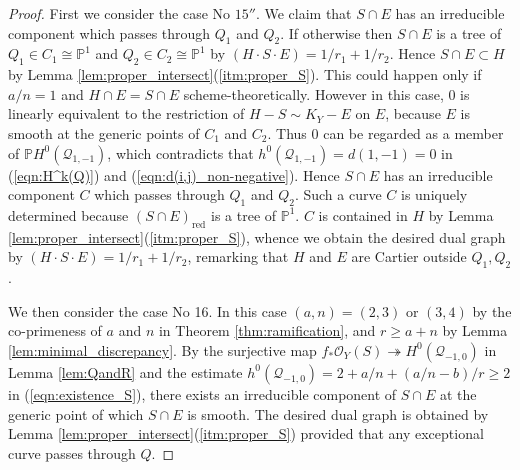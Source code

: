 \documentclass[a4paper,11pt]{amsart}
\theoremstyle{definition}
\theoremstyle{remark}
\numberwithin{equation}{section}
\newcommand{\bP}{{\mathbb P}}
\newcommand{\cO}{{\mathcal O}}
\newcommand{\cQ}{{\mathcal Q}}
\newcommand{\red}{\mathrm{red}}
\begin{document}
\begin{proof}
First we consider the case No $\textrm{15}''$.
We claim that $S \cap E$ has an irreducible component
which passes through $Q_1$ and $Q_2$.
If otherwise then  $S \cap E$ is a tree of
$Q_1 \in C_1 \cong \bP^1$ and $Q_2 \in C_2 \cong \bP^1$
by $(H \cdot S \cdot E)=1/r_1+1/r_2$.
Hence $S \cap E \subset H$
by Lemma \ref{lem:proper_intersect}(\ref{itm:proper_S}).
This could happen only if $a/n=1$ and
$H \cap E=S \cap E$ scheme-theoretically.
However in this case,
$0$ is linearly equivalent to the restriction of $H-S \sim K_Y-E$ on $E$,
because $E$ is smooth at the generic points of $C_1$ and $C_2$.
Thus $0$ can be regarded as a member of $\bP H^0(\cQ_{1,-1})$,
which contradicts that $h^0(\cQ_{1,-1})=d(1,-1)=0$
in (\ref{eqn:H^k(Q)}) and (\ref{eqn:d(i,j)_non-negative}).
Hence $S \cap E$ has an irreducible component $C$
which passes through $Q_1$ and $Q_2$.
Such a curve $C$ is uniquely determined
because $(S \cap E)_\red$ is a tree of $\bP^1$.
$C$ is contained in $H$
by Lemma \ref{lem:proper_intersect}(\ref{itm:proper_S}),
whence we obtain the desired dual graph by $(H \cdot S \cdot E)=1/r_1+1/r_2$,
remarking that $H$ and $E$ are Cartier outside $Q_1,Q_2$.

We then consider the case No 16.
In this case $(a,n)=(2,3)$ or $(3,4)$ by
the co-primeness of $a$ and $n$ in Theorem \ref{thm:ramification},
and $r \ge a+n$ by Lemma \ref{lem:minimal_discrepancy}.
By the surjective map
$f_*\cO_Y(S) \twoheadrightarrow H^0(\cQ_{-1,0})$ in Lemma \ref{lem:QandR}
and the estimate $h^0(\cQ_{-1,0})=2+a/n+(a/n-b)/r\ge2$
in (\ref{eqn:existence_S}),
there exists an irreducible component of $S \cap E$
at the generic point of which $S \cap E$ is smooth.
The desired dual graph is obtained
by Lemma \ref{lem:proper_intersect}(\ref{itm:proper_S})
provided that any exceptional curve passes through $Q$.


\end{proof}
\end{document}
